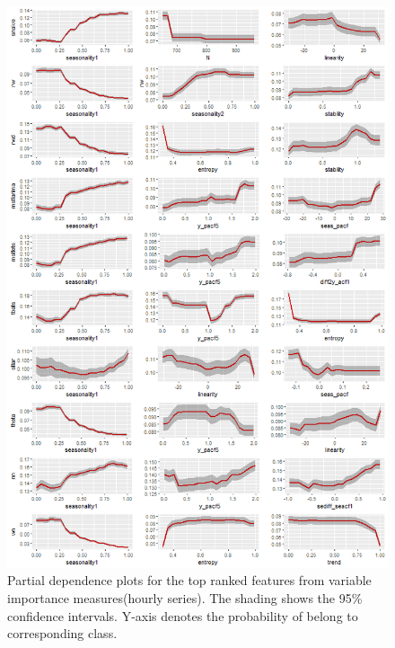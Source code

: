 \documentclass[11pt,a4paper,]{article}
\theoremstyle{definition}
\theoremstyle{definition}
\theoremstyle{definition}
\theoremstyle{remark}
\begin{document}
\begin{figure}
\centering
\includegraphics{figures/hourlypdp-1.png}
\caption{\label{fig:hourlypdp}Partial dependence plots for the top ranked
features from variable importance measures(hourly series). The shading
shows the 95\% confidence intervals. Y-axis denotes the probability of
belong to corresponding class.}
\end{figure}

\newpage
\end{document}
